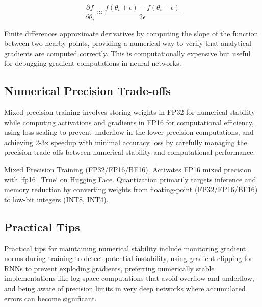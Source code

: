 \begin{equation}
\frac{\partial f}{\partial \theta_i} \approx \frac{f(\theta_i + \epsilon) - f(\theta_i - \epsilon)}{2\epsilon}
\end{equation}

Finite differences approximate derivatives by computing the slope of the function between two nearby points, providing a numerical way to verify that analytical gradients are computed correctly. This is computationally expensive but useful for debugging gradient computations in neural networks.

\subsection{Numerical Precision Trade-offs}

Mixed precision training involves storing weights in FP32 for numerical stability while computing activations and gradients in FP16 for computational efficiency, using loss scaling to prevent underflow in the lower precision computations, and achieving 2-3x speedup with minimal accuracy loss by carefully managing the precision trade-offs between numerical stability and computational performance.

\begin{remark}
Mixed Precision Training (FP32/FP16/BF16). Activates FP16 mixed precision with `fp16=True` on Hugging Face. Quantization primarily targets inference and memory reduction by converting weights from floating-point (FP32/FP16/BF16) to low-bit integers (INT8, INT4).
\end{remark}

\subsection{Practical Tips}

Practical tips for maintaining numerical stability include monitoring gradient norms during training to detect potential instability, using gradient clipping for RNNs to prevent exploding gradients, preferring numerically stable implementations like log-space computations that avoid overflow and underflow, and being aware of precision limits in very deep networks where accumulated errors can become significant.
